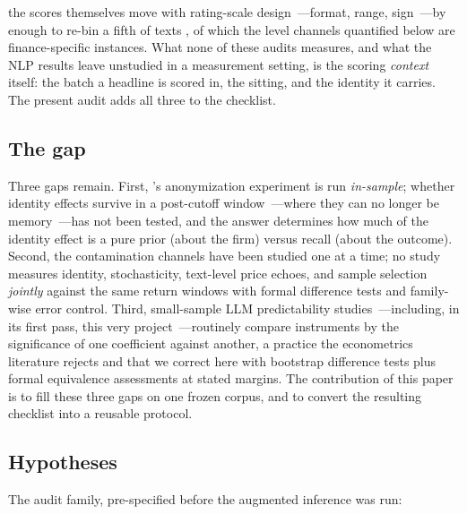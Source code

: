 the scores themselves move with rating-scale design~---format, range, sign~---by enough to re-bin a fifth of texts \citep{jo2026}, of which the level channels quantified below are finance-specific instances. What none of these audits measures, and what the NLP results leave unstudied in a measurement setting, is the scoring \emph{context} itself: the batch a headline is scored in, the sitting, and the identity it carries. The present audit adds all three to the checklist.

\subsection{The gap}

Three gaps remain. First, \citet{glasserman2023}'s anonymization experiment is run \emph{in-sample}; whether identity effects survive in a post-cutoff window~---where they can no longer be memory~---has not been tested, and the answer determines how much of the identity effect is a pure prior (about the firm) versus recall (about the outcome). Second, the contamination channels have been studied one at a time; no study measures identity, stochasticity, text-level price echoes, and sample selection \emph{jointly} against the same return windows with formal difference tests and family-wise error control. Third, small-sample LLM predictability studies~---including, in its first pass, this very project~---routinely compare instruments by the significance of one coefficient against another, a practice the econometrics literature rejects \citep[e.g.,][]{romano2005} and that we correct here with bootstrap difference tests plus formal equivalence assessments at stated margins. The contribution of this paper is to fill these three gaps on one frozen corpus, and to convert the resulting checklist into a reusable protocol.

\subsection{Hypotheses}

The audit family, pre-specified before the augmented inference was run:

